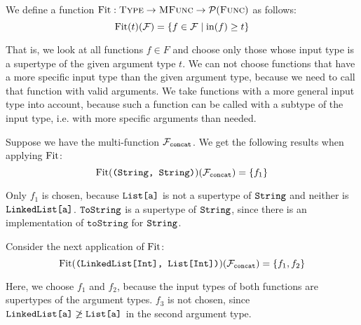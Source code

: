 

\begin{definition}
	We define a function $\operatorname{Fit} : \textsc{Type} \rightarrow \textsc{MFunc} \rightarrow \mathcal{P}(\textsc{Func})$ as follows:
	\begin{equation*}
		\operatorname{Fit}(t)(\mathcal{F}) = \{ f \in \mathcal{F} \mid \operatorname{in}(f) \geq t \}
	\end{equation*}
\end{definition}

\noindent That is, we look at all functions $f \in F$ and choose only those whose input type is a supertype of the given argument type $t$. We can not choose functions that have a more specific input type than the given argument type, because we need to call that function with valid arguments. We take functions with a more general input type into account, because such a function can be called with a subtype of the input type, i.e. with more specific arguments than needed.

\medskip

\noindent Suppose we have the multi-function $\mathcal{F}_{\text{\texttt{concat}}}$. We get the following results when applying $\operatorname{Fit}$:
\begin{equation*}
	\operatorname{Fit}(\texttt{(String, String)})(\mathcal{F}_{\text{\texttt{concat}}}) = \{ f_1 \}
\end{equation*}	
	
\noindent Only $f_1$ is chosen, because $\texttt{List[a]}$ is not a supertype of $\texttt{String}$ and neither is $\texttt{LinkedList[a]}$. $\texttt{ToString}$ is a supertype of $\texttt{String}$, since there is an implementation of $\mathtt{toString}$ for $\texttt{String}$. 
	
\medskip
	
\noindent Consider the next application of $\operatorname{Fit}$:
\begin{equation*}
	\operatorname{Fit}(\texttt{(LinkedList[Int], List[Int])})(\mathcal{F}_{\text{\texttt{concat}}}) = \{ f_1, f_2 \}
\end{equation*}
	
\noindent Here, we choose $f_1$ and $f_2$, because the input types of both functions are supertypes of the argument types. $f_3$ is not chosen, since $\texttt{LinkedList[a]} \not\geq \texttt{List[a]}$ in the second argument type.
	
